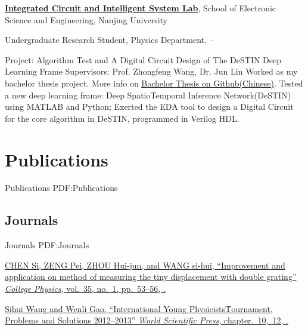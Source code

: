 \documentclass[letterpaper,MMMyyyy,nonstop]{simpleresumecv}
\begin{document}
\begin{body}
\Gap

\href{http://ese.nju.edu.cn/ICAIS/}
{\textbf{Integrated Circuit and Intelligent System Lab}},
School of Electronic Science and Engineering, Nanjing University

\GapNoBreak
\BulletItem
Undergraduate Research Student, Physics Department.
\hfill
{} --
\begin{detail}
\SubBulletItem
Project: Algorithm Test and A Digital Circuit Design of The DeSTIN Deep Learning Frame
\SubBulletItem
Supervisors:
Prof. Zhongfeng Wang, Dr. Jun Lin
\SubBulletItem
Worked as my bachelor thesis project. More info on \href{https://github.com/qubiter/Bachelor-Thesis-Chinese}{\underline{Bachelor Thesis on Github(Chinese)}}.
\SubBulletItem
Tested a new deep learning frame: Deep SpatioTemporal Inference Network(DeSTIN) using MATLAB and Python;
\SubBulletItem
Exerted the EDA tool to design a Digital Circuit for the core algorithm in DeSTIN, programmed in Verilog HDL.
\end{detail}



\section
{Publications}
{Publications}
{PDF:Publications}

\subsection
{Journals}
{Journals}
{PDF:Journals}

\GapNoBreak
\NumberedItem{[1]}
\href{http://www.cnki.net/kcms/detail/detail.aspx?DbCode=CJFQ&dbname=CJFDLAST2016&filename=DXWL201601016&uid=WEEvREcwSlJHSldSdnQ0SWZ2dGI4SEhQemFnWXVOK0VMNTJLSjdyRGFmeEZzNmhzZnp6MFpJRzFnSUJpeVVTaklBPT0=$9A4hF_YAuvQ5obgVAqNKPCYcEjKensW4IQMovwHtwkF4VYPoHbKxJw!!}
{CHEN Si, \underline{ZENG Pei}, ZHOU Hui-jun, and WANG si-hui,
``Improvement and application on method of measuring
the tiny displacement with double grating''
\textit{College Physics},
vol.~35,
no.~1,
pp.~53--56,
.}

\Gap
\NumberedItem{[2]}
\href{http://www.worldscientific.com/worldscibooks/10.1142/9355}
{Sihui Wang and Wenli Gao,
``International Young Physicists\' Tournament, Problems and Solutions 2012–2013''
\textit{World Scientific Press},
chapter.~10,~12,
.}



\end{body}
\end{document}
